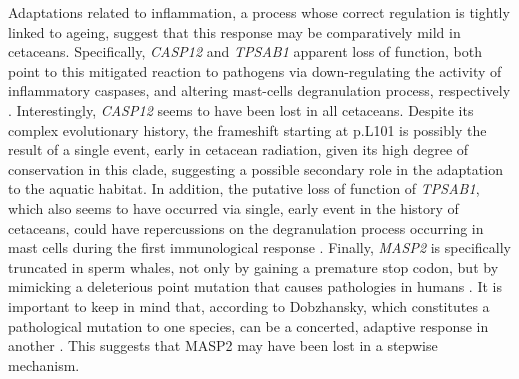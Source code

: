 Adaptations related to inflammation, a process whose correct regulation is tightly linked to ageing, suggest that this response may be comparatively mild in cetaceans.
Specifically, \textit{CASP12} and \textit{TPSAB1} apparent loss of function, both point to this mitigated reaction to pathogens via down-regulating the activity of inflammatory caspases, and altering mast-cells degranulation process, respectively \cite{Abdelmotelb2014,McIlwain2015}.
Interestingly, \textit{CASP12} seems to have been lost in all cetaceans.
Despite its complex evolutionary history, the frameshift starting at {p.L101} %
is possibly the result of a single event, early in cetacean radiation, given its high degree of conservation in this clade, suggesting a possible secondary role in the adaptation to the aquatic habitat. %
In addition, the putative loss of function of \textit{TPSAB1}, which also seems to have occurred via single, early event in the history of cetaceans, could have repercussions on the degranulation process occurring in mast cells during the first immunological response \cite{Wilcock2019}.
Finally, \textit{MASP2} is specifically truncated in sperm whales, not only by gaining a premature stop codon, but by mimicking a deleterious point mutation that causes pathologies in humans%
. 
It is important to keep in mind that, according to Dobzhansky, which constitutes a pathological mutation to one species, can be a concerted, adaptive response in another \cite{Dobzhansky1958}.
This suggests that MASP2 may have been lost in a stepwise mechanism.
